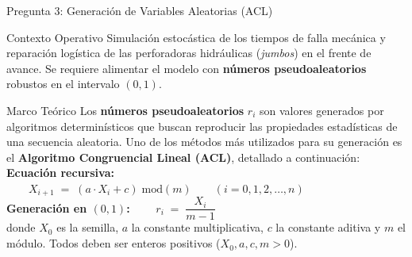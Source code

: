 \documentclass[aspectratio=169, 10pt]{beamer}
\begin{document}
\begin{frame}{Pregunta 3: Generación de Variables Aleatorias (ACL)}
	\begin{block}{Contexto Operativo}
		\justifying
		Simulación estocástica de los tiempos de falla mecánica y reparación
		logística de las perforadoras hidráulicas (\textit{jumbos}) en el frente
		de avance. Se requiere alimentar el modelo con \textbf{números pseudoaleatorios}
		robustos en el intervalo $(0,1)$.
	\end{block}
	\vspace{6pt}
	\begin{alertblock}{Marco Teórico}
		\justifying\small
		Los \textbf{números pseudoaleatorios} $r_i$ son valores generados
		por algoritmos determinísticos que buscan reproducir las propiedades
		estadísticas de una secuencia aleatoria. Uno de los métodos más
		utilizados para su generación es el \textbf{Algoritmo Congruencial
			Lineal (ACL)}, detallado a continuación:\\[6pt]
		\textbf{Ecuación recursiva:} $\qquad X_{i+1} \;=\; (a \cdot X_i + c)\;\mathrm{mod}(m) \qquad	(i = 0,1,2,\ldots,n)$\\[6pt]
		\textbf{Generación en $(0,1)$:} $\qquad r_i \;=\; \dfrac{X_i}{m-1}$\\[6pt]
		donde $X_0$ es la semilla, $a$ la constante multiplicativa,
		$c$ la constante aditiva y $m$ el módulo.
		Todos deben ser enteros positivos ($X_0,a,c,m > 0$).
	\end{alertblock}
\end{frame}
\end{document}
